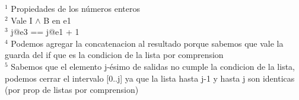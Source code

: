 \noindent $ ^1 $ Propiedades de los números enteros\\
$ ^2 $ Vale I $ \land $ B en e1\\
$ ^3 $ j@e3 == j@e1 + 1\\
$ ^4 $ Podemos agregar la concatenacion al resultado porque sabemos que vale la guarda del if que es la condicion de la lista por comprension\\
$ ^5 $ Sabemos que el elemento j-ésimo de salidas no cumple la condicion de la lista, podemos cerrar el intervalo [0..j] ya que la lista hasta j-1 y hasta j son identicas (por prop de listas por comprension)